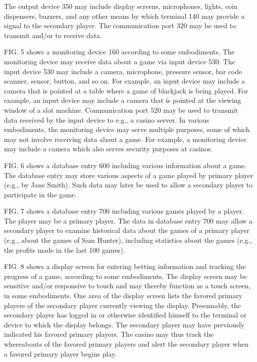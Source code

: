 \documentclass[11pt,a4paper]{article}
\begin{document}
The output device 350 may include display screens, microphones, lights, coin dispensers, buzzers, and any other means by which terminal 140 may provide a signal to the secondary player. The communication port 320 may be used to transmit and/or to receive data.

FIG. 5 shows a monitoring device 160 according to some embodiments. The monitoring device may receive data about a game via input device 530. The input device 530 may include a camera, microphone, pressure sensor, bar code scanner, sensor, button, and so on. For example, an input device may include a camera that is pointed at a table where a game of blackjack is being played. For example, an input device may include a camera that is pointed at the viewing window of a slot machine. Communication port 520 may be used to transmit data received by the input device to e.g., a casino server. In various embodiments, the monitoring device may serve multiple purposes, some of which may not involve receiving data about a game. For example, a monitoring device may include a camera which also serves security purposes at casinos.

FIG. 6 shows a database entry 600 including various information about a game. The database entry may store various aspects of a game played by primary player (e.g., by Jane Smith). Such data may later be used to allow a secondary player to participate in the game.

FIG. 7 shows a database entry 700 including various games played by a player. The player may be a primary player. The data in database entry 700 may allow a secondary player to examine historical data about the games of a primary player (e.g., about the games of Sam Hunter), including statistics about the games (e.g., the profits made in the last 100 games).

FIG. 8 shows a display screen for entering betting information and tracking the progress of a game, according to some embodiments. The display screen may be sensitive and/or responsive to touch and may thereby function as a touch screen, in some embodiments. One area of the display screen lists the favored primary players of the secondary player currently viewing the display. Presumably, the secondary player has logged in or otherwise identified himself to the terminal or device to which the display belongs. The secondary player may have previously indicated his favored primary players. The casino may thus track the whereabouts of the favored primary players and alert the secondary player when a favored primary player begins play.
\end{document}
